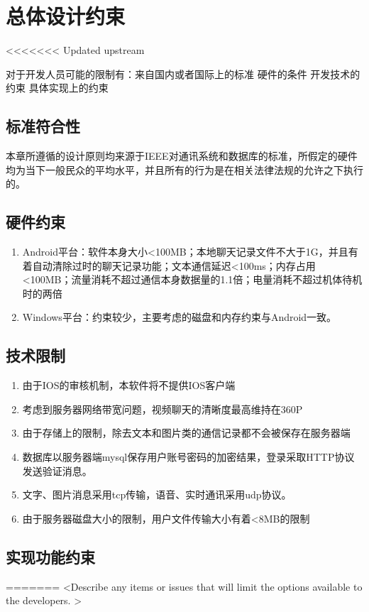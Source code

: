 \chapter{总体设计约束}
<<<<<<< Updated upstream


对于开发人员可能的限制有：来自国内或者国际上的标准
硬件的条件
开发技术的约束
具体实现上的约束
 
\section{标准符合性}


本章所遵循的设计原则均来源于IEEE对通讯系统和数据库的标准，所假定的硬件均为当下一般民众的平均水平，并且所有的行为是在相关法律法规的允许之下执行的。


\section{硬件约束}

\begin{enumerate}
	\item Android平台：软件本身大小<100MB；本地聊天记录文件不大于1G，并且有着自动清除过时的聊天记录功能；文本通信延迟<100ms；内存占用<100MB；流量消耗不超过通信本身数据量的1.1倍；电量消耗不超过机体待机时的两倍
	\item Windows平台：约束较少，主要考虑的磁盘和内存约束与Android一致。
\end{enumerate}

\section{技术限制}

\begin{enumerate}
	\item 由于IOS的审核机制，本软件将不提供IOS客户端
	\item 考虑到服务器网络带宽问题，视频聊天的清晰度最高维持在360P
	\item 
	由于存储上的限制，除去文本和图片类的通信记录都不会被保存在服务器端
	\item 数据库以服务器端mysql保存用户账号密码的加密结果，登录采取HTTP协议发送验证消息。
	\item 文字、图片消息采用tcp传输，语音、实时通讯采用udp协议。
	\item 
	由于服务器磁盘大小的限制，用户文件传输大小有着<8MB的限制
	
\end{enumerate}

\section{实现功能约束}
=======
\iffalse
<Describe any items or issues that will limit the options available to the developers. >

